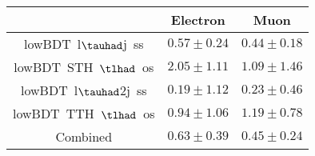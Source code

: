 \centering
\begin{tabular}{|c|c|c|} \hline
 & Electron & Muon\\\hline
lowBDT~l$\tauhad$j~ss & $0.57\pm0.24$ & $0.44\pm0.18$\\\hline
lowBDT~STH~$\tlhad$~os & $2.05\pm1.11$ & $1.09\pm1.46$\\\hline
lowBDT~l$\tauhad$2j~ss & $0.19\pm1.12$ & $0.23\pm0.46$\\\hline
lowBDT~TTH~$\tlhad$~os & $0.94\pm1.06$ & $1.19\pm0.78$\\\hline
Combined & $0.63\pm0.39$ & $0.45\pm0.24$\\\hline
\end{tabular}
